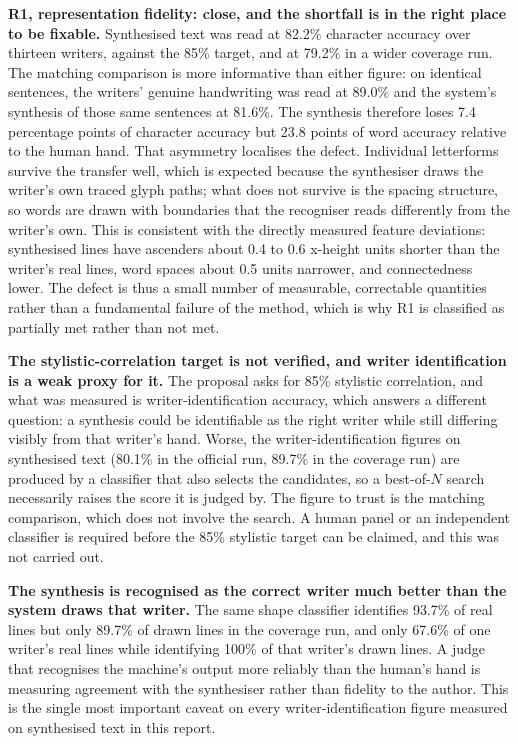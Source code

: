         \textbf{R1, representation fidelity: close, and the shortfall is in the right place to be fixable.}
        Synthesised text was read at 82.2\% character accuracy over thirteen writers, against the 85\% target, and at 79.2\% in a wider coverage run.
        The matching comparison is more informative than either figure: on identical sentences, the writers' genuine handwriting was read at 89.0\% and the system's synthesis of those same sentences at 81.6\%.
        The synthesis therefore loses 7.4 percentage points of character accuracy but 23.8 points of word accuracy relative to the human hand.
        That asymmetry localises the defect.
        Individual letterforms survive the transfer well, which is expected because the synthesiser draws the writer's own traced glyph paths; what does not survive is the spacing structure, so words are drawn with boundaries that the recogniser reads differently from the writer's own.
        This is consistent with the directly measured feature deviations: synthesised lines have ascenders about 0.4 to 0.6 x-height units shorter than the writer's real lines, word spaces about 0.5 units narrower, and connectedness lower.
        The defect is thus a small number of measurable, correctable quantities rather than a fundamental failure of the method, which is why R1 is classified as partially met rather than not met.

        \textbf{The stylistic-correlation target is not verified, and writer identification is a weak proxy for it.}
        The proposal asks for 85\% stylistic correlation, and what was measured is writer-identification accuracy, which answers a different question: a synthesis could be identifiable as the right writer while still differing visibly from that writer's hand.
        Worse, the writer-identification figures on synthesised text (80.1\% in the official run, 89.7\% in the coverage run) are produced by a classifier that also selects the candidates, so a best-of-$N$ search necessarily raises the score it is judged by.
        The figure to trust is the matching comparison, which does not involve the search.
        A human panel or an independent classifier is required before the 85\% stylistic target can be claimed, and this was not carried out.

        \textbf{The synthesis is recognised as the correct writer much better than the system draws that writer.}
        The same shape classifier identifies 93.7\% of real lines but only 89.7\% of drawn lines in the coverage run, and only 67.6\% of one writer's real lines while identifying 100\% of that writer's drawn lines.
        A judge that recognises the machine's output more reliably than the human's hand is measuring agreement with the synthesiser rather than fidelity to the author.
        This is the single most important caveat on every writer-identification figure measured on synthesised text in this report.

